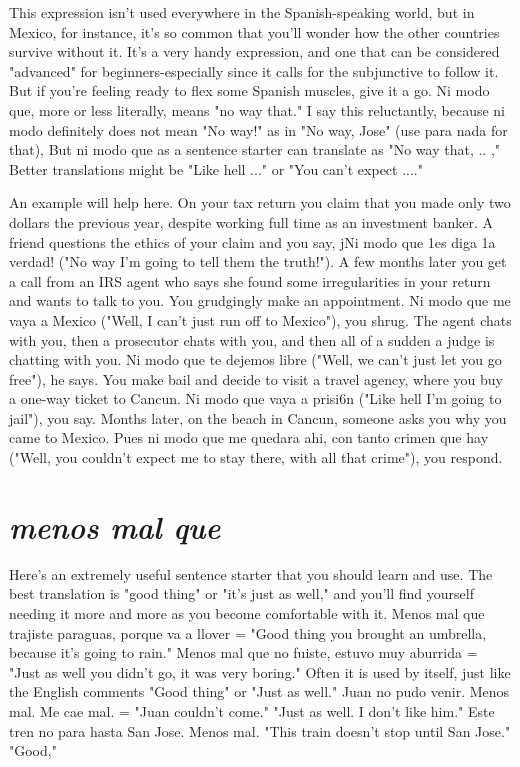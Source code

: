 This expression isn't used everywhere in the Spanish-speaking
world, but in Mexico, for instance, it's so common that you'll wonder
how the other countries survive without it. It's a very handy expression, and one that can be considered "advanced" for beginners-especially since it calls for the subjunctive to follow it. But if you're feeling
ready to flex some Spanish muscles, give it a go. Ni modo que, more or
less literally, means "no way that." I say this reluctantly, because ni
modo definitely does not mean "No way!" as in "No way, Jose" (use
para nada for that), But ni modo que as a sentence starter can translate as "No way that, .. ," Better translations might be "Like hell ..."
or "You can't expect ...."

An example will help here. On your tax return you claim that
you made only two dollars the previous year, despite working full time
as an investment banker. A friend questions the ethics of your claim
and you say, jNi modo que 1es diga 1a verdad! ("No way I'm going to
tell them the truth!"). A few months later you get a call from an IRS
agent who says she found some irregularities in your return and wants
to talk to you. You grudgingly make an appointment. Ni modo que me
vaya a Mexico ("Well, I can't just run off to Mexico"), you shrug. The
agent chats with you, then a prosecutor chats with you, and then all of
a sudden a judge is chatting with you. Ni modo que te dejemos libre
("Well, we can't just let you go free"), he says. You make bail and decide to visit a travel agency, where you buy a one-way ticket to Cancun. Ni modo que vaya a prisi6n ("Like hell I'm going to jail"), you
say. Months later, on the beach in Cancun, someone asks you why you
came to Mexico. Pues ni modo que me quedara ahi, con tanto crimen
que hay ("Well, you couldn't expect me to stay there, with all that
crime"), you respond.

\section{\emph{menos mal que}}

Here's an extremely useful sentence starter that you should
learn and use. The best translation is "good thing" or "it's just as
well," and you'll find yourself needing it more and more as you become
comfortable with it. Menos mal que trajiste paraguas, porque va a
llover = "Good thing you brought an umbrella, because it's going to
rain." Menos mal que no fuiste, estuvo muy aburrida = "Just as well
you didn't go, it was very boring." Often it is used by itself, just like
the English comments "Good thing" or "Just as well." Juan no pudo
venir. Menos mal. Me cae mal. = "Juan couldn't come." "Just as well.
I don't like him." Este tren no para hasta San Jose. Menos mal.
"This train doesn't stop until San Jose." "Good,"

